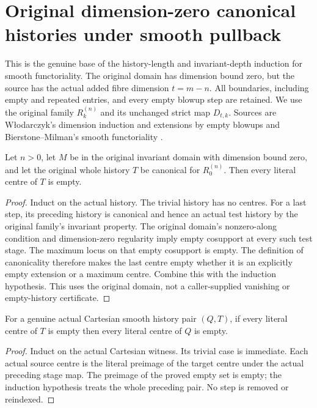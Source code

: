 \section{Original dimension-zero canonical histories under smooth pullback}

This is the genuine base of the history-length and invariant-depth induction
for smooth functoriality. The original domain has dimension bound zero,
but the source has the actual added fibre dimension $t=m-n$. All boundaries,
including empty and repeated entries, and every empty blowup step are retained.
We use the original family $R^{(n)}_k$ and its unchanged strict map $D_{t,k}$.
Sources are W\l odarczyk's dimension induction and extensions by empty blowups
and Bierstone--Milman's smooth functoriality
\cite{wlodarczyk05-hironaka,bierstone-milman08-functoriality}.

\begin{theorem}
\label{hir:smooth-original-zero-canonical-empty}
\leanok
{}
Let $n>0$, let $M$ be in the original invariant domain with dimension bound
zero, and let the original whole history $T$ be canonical for $R^{(n)}_0$.
Then every literal centre of $T$ is empty.
\end{theorem}
\begin{proof}
Induct on the actual history. The trivial history has no centres. For a
last step, its preceding history is canonical and hence an actual test
history by the original family's invariant property. The original domain's
nonzero-along condition and dimension-zero regularity imply empty cosupport
at every such test stage. The maximum locus on that empty cosupport is
empty. The definition of canonicality therefore makes the last centre
empty whether it is an explicitly empty extension or a maximum centre.
Combine this with the induction hypothesis. This uses the original domain,
not a caller-supplied vanishing or empty-history certificate.
\end{proof}

\begin{theorem}
\label{hir:smooth-actual-empty-history-pullback}
\leanok
{}
For a genuine actual Cartesian smooth history pair $(Q,T)$, if every
literal centre of $T$ is empty then every literal centre of $Q$ is empty.
\end{theorem}
\begin{proof}
Induct on the actual Cartesian witness. Its trivial case is immediate.
Each actual source centre is the literal preimage of the target centre
under the actual preceding stage map. The preimage of the proved empty
set is empty; the induction hypothesis treats the whole preceding pair.
No step is removed or reindexed.
\end{proof}

